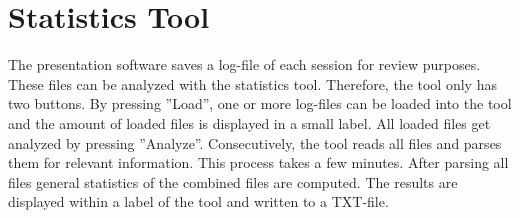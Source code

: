 %


\section{Statistics Tool}
\label{implementation_tool}
 
The presentation software saves a log-file of each session for review purposes. These files can be analyzed with the statistics tool. Therefore, the tool only has two buttons. By pressing ''Load'', one or more log-files can be loaded into the tool and the amount of loaded files is displayed in a small label. All loaded files get analyzed by pressing ''Analyze''. Consecutively, the tool reads all files and parses them for relevant information. This process takes a few minutes. After parsing all files general statistics of the combined files are computed. The results are displayed within a label of the tool and written to a TXT-file.

